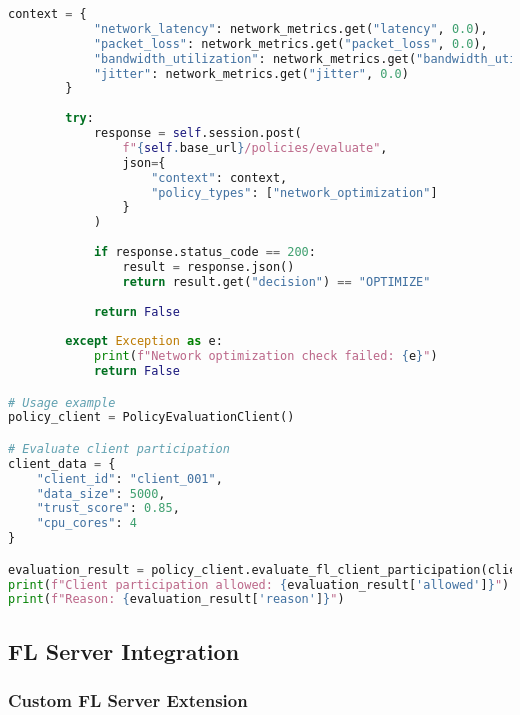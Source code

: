 \begin{lstlisting}[language=python, caption=Policy Evaluation Client]
        context = {
            "network_latency": network_metrics.get("latency", 0.0),
            "packet_loss": network_metrics.get("packet_loss", 0.0),
            "bandwidth_utilization": network_metrics.get("bandwidth_util", 0.0),
            "jitter": network_metrics.get("jitter", 0.0)
        }
        
        try:
            response = self.session.post(
                f"{self.base_url}/policies/evaluate",
                json={
                    "context": context,
                    "policy_types": ["network_optimization"]
                }
            )
            
            if response.status_code == 200:
                result = response.json()
                return result.get("decision") == "OPTIMIZE"
            
            return False
        
        except Exception as e:
            print(f"Network optimization check failed: {e}")
            return False

# Usage example
policy_client = PolicyEvaluationClient()

# Evaluate client participation
client_data = {
    "client_id": "client_001",
    "data_size": 5000,
    "trust_score": 0.85,
    "cpu_cores": 4
}

evaluation_result = policy_client.evaluate_fl_client_participation(client_data)
print(f"Client participation allowed: {evaluation_result['allowed']}")
print(f"Reason: {evaluation_result['reason']}")
\end{lstlisting}

\subsection{FL Server Integration}

\subsubsection{Custom FL Server Extension}

